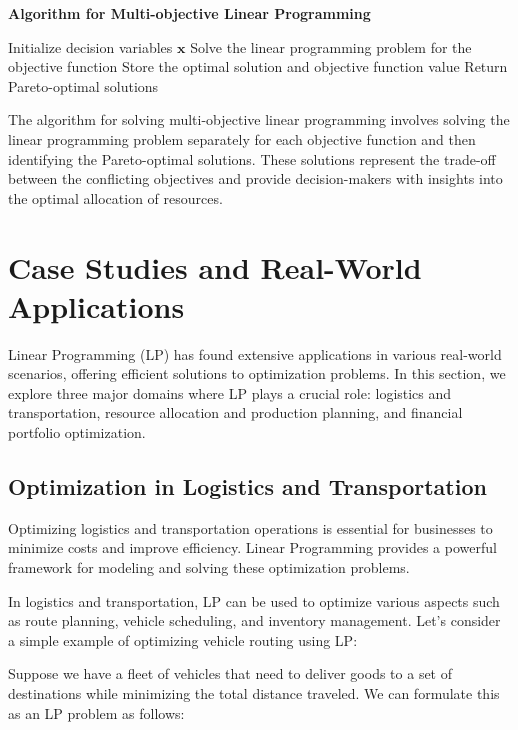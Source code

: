 \documentclass[12pt]{book} %
\begin{document}
\textbf{Algorithm for Multi-objective Linear Programming}
\FloatBarrier
\begin{algorithm}
\caption{Multi-objective Linear Programming}
\begin{algorithmic}[1]
\State Initialize decision variables $\mathbf{x}$
    \State Solve the linear programming problem for the objective function
    \State Store the optimal solution and objective function value
\EndFor
\State Return Pareto-optimal solutions
\end{algorithmic}
\end{algorithm}
\FloatBarrier
The algorithm for solving multi-objective linear programming involves solving the linear programming problem separately for each objective function and then identifying the Pareto-optimal solutions. These solutions represent the trade-off between the conflicting objectives and provide decision-makers with insights into the optimal allocation of resources.


\section{Case Studies and Real-World Applications}

Linear Programming (LP) has found extensive applications in various real-world scenarios, offering efficient solutions to optimization problems. In this section, we explore three major domains where LP plays a crucial role: logistics and transportation, resource allocation and production planning, and financial portfolio optimization.

\subsection{Optimization in Logistics and Transportation}

Optimizing logistics and transportation operations is essential for businesses to minimize costs and improve efficiency. Linear Programming provides a powerful framework for modeling and solving these optimization problems.

In logistics and transportation, LP can be used to optimize various aspects such as route planning, vehicle scheduling, and inventory management. Let's consider a simple example of optimizing vehicle routing using LP:

Suppose we have a fleet of vehicles that need to deliver goods to a set of destinations while minimizing the total distance traveled. We can formulate this as an LP problem as follows:
\end{document}
